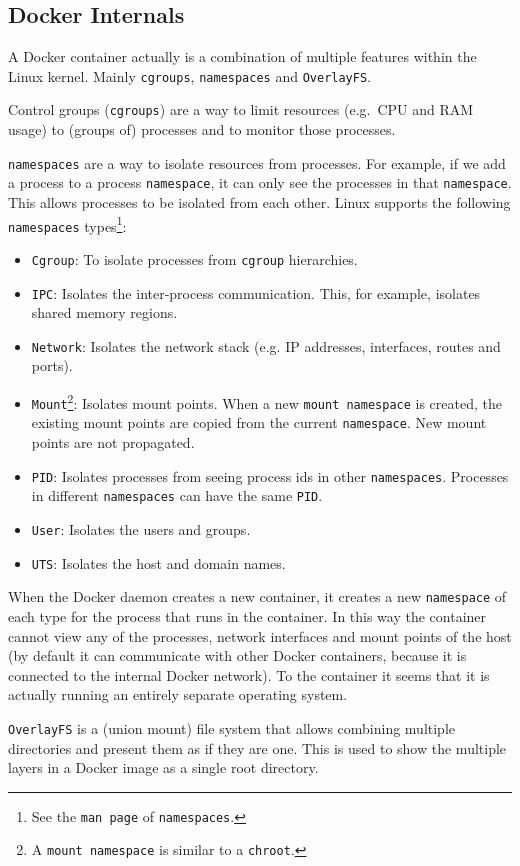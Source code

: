 \subsection{Docker Internals}\label{subsubsection:internals}
A Docker container actually is a combination of multiple features within the Linux kernel.
Mainly \lstinline{cgroups}, \lstinline{namespaces} and \lstinline{OverlayFS}.

\medskip

Control groups (\lstinline{cgroups}) are a way to limit resources (e.g.\ CPU and RAM usage) to (groups of) processes and to monitor those processes.

\medskip

\lstinline{namespaces} are a way to isolate resources from processes. For example, if we add a process to a process \lstinline{namespace}, it can only see the processes in that \lstinline{namespace}. This allows processes to be isolated from each other. Linux supports the following \lstinline{namespaces} types\footnote{See the \lstinline{man page} of \lstinline{namespaces}.}:
\begin{itemize}
    \item \lstinline{Cgroup}: To isolate processes from \lstinline{cgroup} hierarchies.
    \item \lstinline{IPC}: Isolates the inter-process communication. This, for example, isolates shared memory regions.
    \item \lstinline{Network}: Isolates the network stack (e.g. IP addresses, interfaces, routes and ports).
    \item \lstinline{Mount}\footnote{A \lstinline{mount namespace} is similar to a \lstinline{chroot}.}: Isolates mount points. When a new \lstinline{mount namespace} is created, the existing mount points are copied from the current \lstinline{namespace}. New mount points are not propagated.
    \item \lstinline{PID}: Isolates processes from seeing process ids in other \lstinline{namespaces}. Processes in different \lstinline{namespaces} can have the same \lstinline{PID}.
    \item \lstinline{User}: Isolates the users and groups.
    \item \lstinline{UTS}: Isolates the host and domain names.
\end{itemize}

When the Docker daemon creates a new container, it creates a new \lstinline{namespace} of each type for the process that runs in the container. In this way the container cannot view any of the processes, network interfaces and mount points of the host (by default it can communicate with other Docker containers, because it is connected to the internal Docker network). To the container it seems that it is actually running an entirely separate operating system.

\medskip

\lstinline{OverlayFS} is a (union mount) file system that allows combining multiple directories and present them as if they are one. This is used to show the multiple layers in a Docker image as a single root directory.
